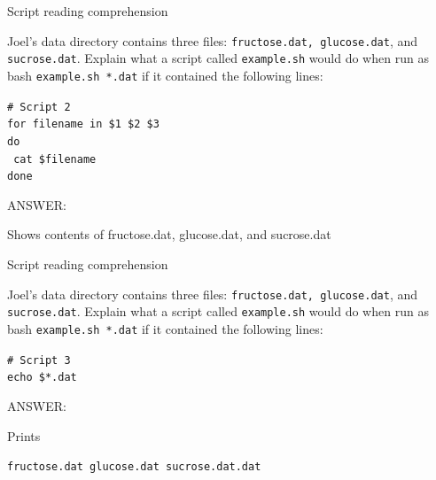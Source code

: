 \documentclass{beamer}
\begin{document}

\begin{frame}{Script reading comprehension}

Joel's data directory contains three files: \texttt{fructose.dat, glucose.dat}, and \texttt{sucrose.dat}. Explain what a script called \texttt{example.sh} would do when run as bash \texttt{example.sh *.dat} if it contained the following lines:
\vspace{0.5cm}

\begin{beamerboxesrounded}[upper=uppercolgreen,lower=lowercolgreen,shadow=false]{}
\small{\texttt{\# Script 2\\
for filename in \$1 \$2 \$3\\
do\\}
\texttt{         cat \$filename\\}
\texttt{done\\}}
\end{beamerboxesrounded}

\alert{ANSWER:}

Shows contents of fructose.dat, glucose.dat, and sucrose.dat

\end{frame}


\begin{frame}{Script reading comprehension}

Joel's data directory contains three files: \texttt{fructose.dat, glucose.dat}, and \texttt{sucrose.dat}. Explain what a script called \texttt{example.sh} would do when run as bash \texttt{example.sh *.dat} if it contained the following lines:
\vspace{0.5cm}

\begin{beamerboxesrounded}[upper=uppercolgreen,lower=lowercolgreen,shadow=false]{}
\small{\texttt{\# Script 3\\
echo \$*.dat}}
\end{beamerboxesrounded}

\alert{ANSWER:}

Prints

\texttt{fructose.dat glucose.dat sucrose.dat.dat}

\end{frame}


\end{document}
